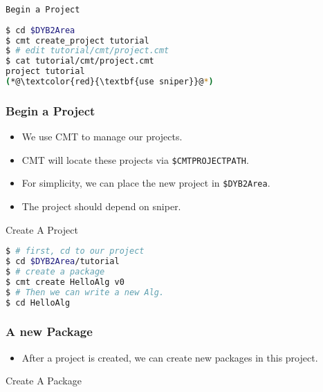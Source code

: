 \begin{frame}
    \begin{center}
        \LARGE \tt{Begin a Project}
    \end{center}
\end{frame}

\newsavebox{\createproject}
\begin{lrbox}{\createproject}
\begin{lstlisting}[language=bash]
$ cd $DYB2Area
$ cmt create_project tutorial
$ # edit tutorial/cmt/project.cmt
$ cat tutorial/cmt/project.cmt
project tutorial
(*@\textcolor{red}{\textbf{use sniper}}@*)
\end{lstlisting}
\end{lrbox}

\begin{frame}
    \frametitle{Begin a Project}
    \begin{itemize}
        \item We use CMT to manage our projects.
        \item CMT will locate these projects via {\tt \$CMTPROJECTPATH}.
        \item For simplicity, we can place the
               new project in {\tt \$DYB2Area}.
        \item The project should depend on sniper.
    \end{itemize}
    \begin{block}{Create A Project}
        \par\usebox{\createproject}
    \end{block}
\end{frame}

\newsavebox{\createpackage}
\begin{lrbox}{\createpackage}
\begin{lstlisting}[language=bash]
$ # first, cd to our project
$ cd $DYB2Area/tutorial
$ # create a package
$ cmt create HelloAlg v0
$ # Then we can write a new Alg.
$ cd HelloAlg
\end{lstlisting}
\end{lrbox}

\begin{frame}
    \frametitle{A new Package}
    \begin{itemize}
        \item After a project is created, we can create new packages
                in this project.
    \end{itemize}
    \begin{block}{Create A Package}
        \par\usebox{\createpackage}
    \end{block}
\end{frame}

